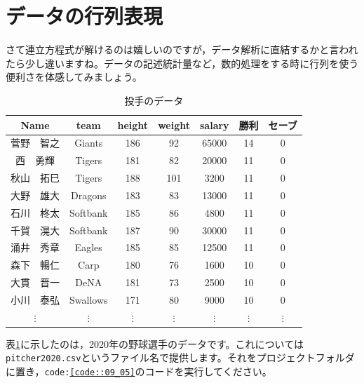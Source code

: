 \documentclass{ltjsbook}
\begin{document}
\section{データの行列表現}
さて連立方程式が解けるのは嬉しいのですが，データ解析に直結するかと言われたら少し違いますね。データの記述統計量など，数的処理をする時に行列を使う便利さを体感してみましょう。

\begin{table}
    \caption{投手のデータ}
    \centering
    \begin{tabular}[t]{ccccccc}
    \hline
    Name & team & height & weight & salary & 勝利 & セーブ\\
    \hline
    菅野　智之 & Giants & 186 & 92 & 65000 & 14 & 0\\
    西　勇輝 & Tigers & 181 & 82 & 20000 & 11 & 0\\
    秋山　拓巳 & Tigers & 188 & 101 & 3200 & 11 & 0\\
    大野　雄大 & Dragons & 183 & 83 & 13000 & 11 & 0\\
    石川　柊太 & Softbank & 185 & 86 & 4800 & 11 & 0\\
    千賀　滉大 & Softbank & 187 & 90 & 30000 & 11 & 0\\
    涌井　秀章 & Eagles & 185 & 85 & 12500 & 11 & 0\\
    森下　暢仁 & Carp & 180 & 76 & 1600 & 10 & 0\\
    大貫　晋一 & DeNA & 181 & 73 & 2500 & 10 & 0\\
    小川　泰弘 & Swallows & 171 & 80 & 9000 & 10 & 0\\
     $\vdots$ & $\vdots$ & $\vdots$  & $\vdots$  & $\vdots$  & $\vdots$  & $\vdots$ \\
    \hline
    \end{tabular}
    \label{tbl::09_01}
    \end{table}

表\ref{tbl::09_01}に示したのは，2020年の野球選手のデータです。これについては\texttt{pitcher2020.csv}というファイル名で提供します。それをプロジェクトフォルダに置き，\texttt{code:\ref{code::09_05}}のコードを実行してください。
\end{document}

